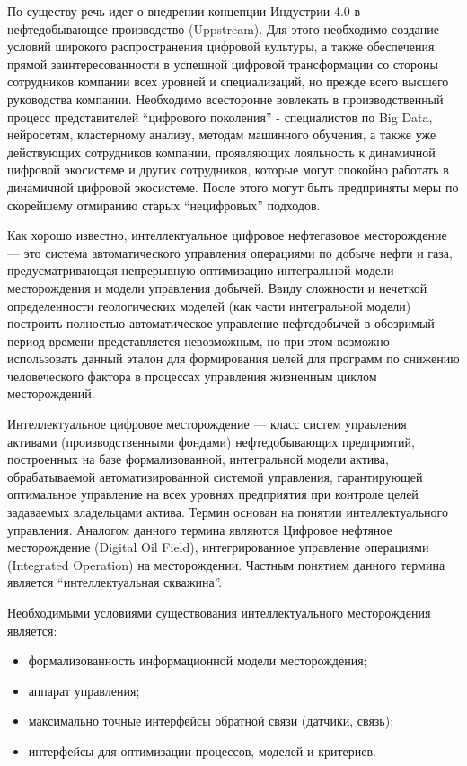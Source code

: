 По существу речь идет о внедрении концепции Индустрии 4.0 в нефтедобывающее производство (Uppstream).
Для этого необходимо создание условий широкого распространения цифровой культуры, а также обеспечения прямой заинтересованности в успешной цифровой трансформации со стороны сотрудников компании всех уровней и специализаций, но прежде всего высшего руководства компании.
Необходимо всесторонне вовлекать в производственный процесс представителей ``цифрового поколения'' - специалистов по Big Data, нейросетям, кластерному анализу, методам машинного обучения, а также уже действующих сотрудников компании, проявляющих лояльность к динамичной цифровой экосистеме и других сотрудников, которые могут спокойно работать в динамичной цифровой экосистеме.
После этого могут быть предприняты меры по скорейшему отмиранию старых ``нецифровых'' подходов.

Как хорошо известно, интеллектуальное цифровое нефтегазовое месторождение --- это система автоматического управления операциями по добыче нефти и газа, предусматривающая непрерывную оптимизацию интегральной модели месторождения и модели управления добычей.
Ввиду сложности и нечеткой определенности геологических моделей (как части интегральной модели) построить полностью автоматическое управление нефтедобычей в обозримый период времени представляется невозможным, но при этом возможно использовать данный эталон для формирования целей для программ по снижению человеческого фактора в процессах управления жизненным циклом месторождений.

Интеллектуальное цифровое месторождение --- класс систем управления активами (производственными фондами) нефтедобывающих предприятий, построенных на базе формализованной, интегральной модели актива, обрабатываемой автоматизированной системой управления, гарантирующей оптимальное управление на всех уровнях предприятия при контроле целей задаваемых владельцами актива.
Термин основан на понятии интеллектуального управления.
Аналогом данного термина являются Цифровое нефтяное месторождение (Digital Oil Field), интегрированное управление операциями (Integrated Operation) на месторождении.
Частным понятием данного термина является ``интеллектуальная скважина''.

Необходимыми условиями существования интеллектуального месторождения является:
  
\begin{itemize} 
	\tightlist 
	\item формализованность информационной модели месторождения;
	\item аппарат управления; 
	\item максимально точные интерфейсы обратной связи (датчики, связь);
	\item интерфейсы для оптимизации процессов, моделей и критериев.
\end{itemize}  

